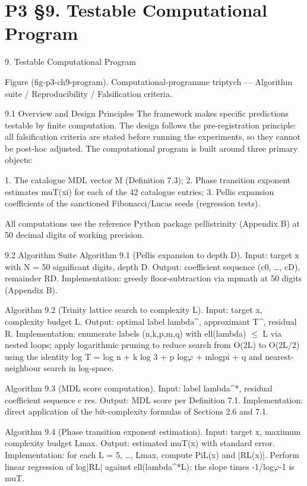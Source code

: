 
\section{P3 §9. Testable Computational Program}

9. Testable Computational Program

                Figure (fig-p3-ch9-program). Computational-programme triptych --- Algorithm suite /
                                       Reproducibility / Falsification criteria.

  9.1 Overview and Design Principles
  The framework makes specific predictions testable by finite computation. The design
  follows the pre-registration principle: all falsification criteria are stated before running
  the experiments, so they cannot be post-hoc adjusted. The computational program is
  built around three primary objects:

  1. The catalogue MDL vector M (Definition 7.3);
  2. Phase transition exponent estimates muT(xi) for each of the 42 catalogue entries;
  3. Pellis expansion coefficients of the sanctioned Fibonacci/Lucas seeds (regression
  tests).

  All computations use the reference Python package pellistrinity (Appendix B) at 50
  decimal digits of working precision.

  9.2 Algorithm Suite
  Algorithm 9.1 (Pellis expansion to depth D).
  Input: target x with N = 50 significant digits, depth D.
  Output: coefficient sequence (c0, …, cD), remainder RD.
  Implementation: greedy floor-subtraction via mpmath at 50 digits (Appendix B).

  Algorithm 9.2 (Trinity lattice search to complexity L).
  Input: target x, complexity budget L.
  Output: optimal label lambda^, approximant T^, residual R.
  Implementation: enumerate labels (n,k,p,m,q) with ell(lambda) $\leq$ L via nested loops;
  apply logarithmic pruning to reduce search from O(2L) to O(2L/2) using the identity log
  T = log n + k log 3 + p log$\varphi$ + mlogpi + q and nearest-neighbour search in log-space.

  Algorithm 9.3 (MDL score computation).
  Input: label lambda^*, residual coefficient sequence c res.
  Output: MDL score per Definition 7.1.
  Implementation: direct application of the bit-complexity formulas of Sections 2.6 and
  7.1.

  Algorithm 9.4 (Phase transition exponent estimation).
  Input: target x, maximum complexity budget Lmax.
  Output: estimated muT(x) with standard error.
  Implementation: for each L = 5, …, Lmax, compute PiL(x) and |RL(x)|. Perform linear
  regression of log|RL| against ell(lambda^*L); the slope times -1/log$\varphi$-1 is muT.

